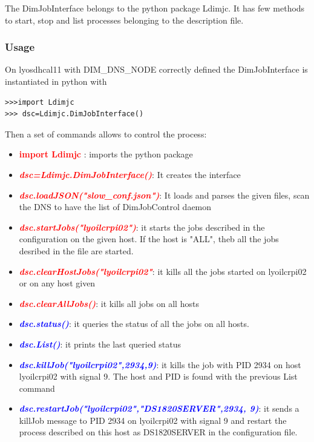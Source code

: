 \documentclass[english]{article}
\begin{document}
The DimJobInterface belongs to the python package Ldimjc. It has few methods to start, stop and list processes belonging to the description file.
\subsubsection{Usage}
On lyosdhcal11 with DIM\_DNS\_NODE correctly defined the DimJobInterface is instantiated in python with
\begin{verbatim}
>>>import Ldimjc
>>> dsc=Ldimjc.DimJobInterface()
\end{verbatim}

Then a set of commands allows to control the process:
\begin{itemize} 
\item \textcolor{red}{ \bf  import Ldimjc} :  imports the python package

\item \textcolor{red}{\it \bf dsc=Ldimjc.DimJobInterface()}: It creates the interface 

\item \textcolor{red}{\it \bf dsc.loadJSON("slow\_conf.json")}: It loads and parses the given files, scan the DNS to have the list of DimJobControl daemon   

\item \textcolor{red}{\it \bf dsc.startJobs("lyoilcrpi02")}: it starts the jobs described in the configuration on the given host. If the host is "ALL", theb all the jobs desribed in the file are started. 
\item \textcolor{red}{\it \bf dsc.clearHostJobs("lyoilcrpi02"}: it kills all the jobs started on lyoilcrpi02 or on any host given
 \item \textcolor{red}{\it \bf dsc.clearAllJobs()}: it kills all jobs on all hosts
\item \textcolor{blue}{\it \bf dsc.status()}: it queries the status of all the jobs on all hosts.
\item \textcolor{blue}{\it \bf dsc.List()}: it prints the last queried status
\item \textcolor{blue}{\it \bf dsc.killJob("lyoilcrpi02",2934,9)}: it kills the job with PID 2934 on host lyoilcrpi02 with signal 9. The host and PID is found with the previous List command

\item \textcolor{blue}{\it \bf dsc.restartJob("lyoilcrpi02","DS1820SERVER",2934, 9)}: it sends a killJob message to PID 2934 on lyoilcrpi02 with signal 9 and restart the process described on this host as DS1820SERVER in the configuration file.


\end{itemize} 
\end{document}
